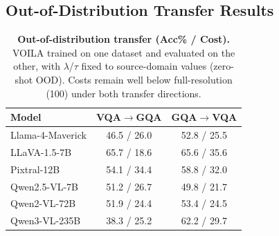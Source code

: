 \begin{table}[htb]
\centering
\small
\setlength{\tabcolsep}{4pt}
\caption{\textbf{LoCoMo memory recall (Acc\% / Cost).}
\textsc{VOILA} trained on VQA-v2+GQA, evaluated on LoCoMo (OOD). Limited to two VLMs due to GPT-4o answer-generation cost.
}
\label{tab:locomo_ultracompact_appendix}
\end{table}

\subsection{Out-of-Distribution Transfer Results}
\label{sec:ood_results}

\begin{table}[htb]
\centering
\small
\setlength{\tabcolsep}{3pt}
\renewcommand{\arraystretch}{0.95}
\caption{\textbf{Out-of-distribution transfer (Acc\% / Cost).}
\textsc{VOILA} trained on one dataset and evaluated on the other, with $\lambda$/$\tau$ fixed to source-domain values (zero-shot OOD). Costs remain well below full-resolution (100) under both transfer directions.}
\label{tab:ood_pixtral_compact_appendix}
\begin{tabular}{lcc}
\toprule
\textbf{Model}
& \textbf{VQA$\rightarrow$GQA}
& \textbf{GQA$\rightarrow$VQA} \\
\midrule
Llama-4-Maverick & 46.5 / 26.0 & 52.8 / 25.5 \\
LLaVA-1.5-7B    & 65.7 / 18.6 & 65.6 / 35.6 \\
Pixtral-12B      & 54.1 / 34.4 & 58.8 / 32.0 \\
Qwen2.5-VL-7B   & 51.2 / 26.7 & 49.8 / 21.7 \\
Qwen2-VL-72B    & 51.9 / 24.4 & 53.4 / 24.5 \\
Qwen3-VL-235B   & 38.3 / 25.2 & 62.2 / 29.7 \\
\bottomrule
\end{tabular}
\end{table}

\pagebreak
